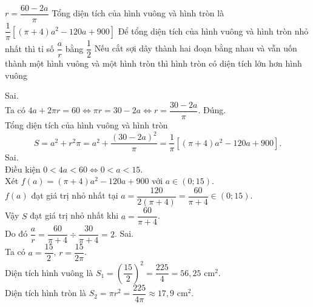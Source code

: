 \begin{ex}%
	\choiceTF
	{$r=\dfrac{60-2a}{\pi}$}
	{Tổng diện tích của hình vuông và hình tròn là $\dfrac{1}{\pi}\left[(\pi+4)a^2-120a+900\right]$}
	{\True Để tổng diện tích của hình vuông và hình tròn nhỏ nhất thì tỉ số $\dfrac ar$ bằng $\dfrac12$}
	{Nếu cắt sợi dây thành hai đoạn bằng nhau và vẫn uốn thành một hình vuông và một hình tròn thì hình tròn có diện tích lớn hơn hình vuông}
	\loigiai
	{
		
		\begin{itemchoice}
			\itemch Sai.\\ %
			Ta có $4a+2\pi r=60\Leftrightarrow \pi r=30-2a\Leftrightarrow r=\dfrac{30-2a}{\pi}$.
			\itemch Đúng.\\ %
			Tổng diện tích của hình vuông và hình tròn $$S=a^2+r^2\pi=a^2+\dfrac{(30-2a)^2}{\pi}=\dfrac{1}{\pi}\left[(\pi+4)a^2-120a+900\right].$$
			\itemch Sai.\\ %
			Điều kiện $0<4a<60\Leftrightarrow 0<a<15$.\\
			Xét $f(a)=(\pi+4)a^2-120a+900$ với $a\in(0; 15)$.\\
			$f(a)$ đạt giá trị nhỏ nhất tại $a=\dfrac{120}{2(\pi+4)}=\dfrac{60}{\pi+4}\in(0; 15)$.\\
			Vậy $S$ đạt giá trị nhỏ nhất khi $a=\dfrac{60}{\pi+4}$.\\
			Do đó $\dfrac{a}{r}=\dfrac{60}{\pi+4}\div\dfrac{30}{\pi+4}=2$.
			\itemch Sai.\\ %
			Ta có $a=\dfrac{15}{2}$, $r=\dfrac{15}{2\pi}$.\\
			Diện tích hình vuông là $S_1=\left(\dfrac{15}{2}\right)^2=\dfrac{225}{4}=56{,}25$ cm$^2$.\\
			Diện tích hình tròn là $S_2=\pi r^2=\dfrac{225}{4\pi}\approx 17{,}9$ cm$^2$.
		\end{itemchoice}
	}
\end{ex}

